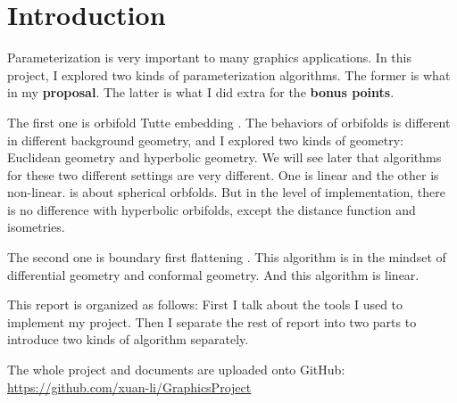 \section{Introduction}
Parameterization is very important to many graphics applications. In this project, I explored two kinds of parameterization algorithms. The former is what in my \textbf{proposal}. The latter is what I did extra for the \textbf{bonus points}.

The first one is orbifold Tutte embedding \cite{Aigerman:2015:OTE:2816795.2818099}\cite{Aigerman:2016:HOT:2980179.2982412} . The behaviors of orbifolds is different in different background geometry, and I explored two kinds of geometry: Euclidean geometry and hyperbolic geometry. We will see later that algorithms for these two different settings are very different. One is linear and the other is non-linear.
\cite{Aigerman:2017:SOT:3072959.3073615} is about spherical orbfolds. But in the level of implementation, there is no difference with hyperbolic orbifolds, except the distance function and isometries.

The second one is boundary first flattening \cite{1704.06873}. This algorithm is in the mindset of differential geometry and conformal geometry. And this algorithm is linear. 

This report is organized as follows: First I talk about the tools I used to implement my project. Then I separate the rest of report into two parts to introduce two kinds of algorithm separately.

The whole project and documents are uploaded onto GitHub:  \url{https://github.com/xuan-li/GraphicsProject}